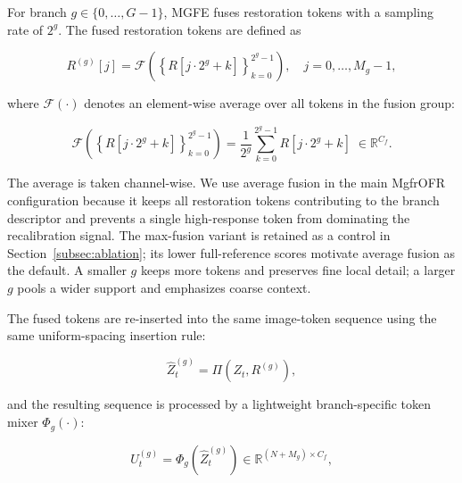 \documentclass[symmetry,article,submit,pdftex,moreauthors]{Definitions/mdpi}
\begin{document}
For branch $g \in \{0,\ldots,G-1\}$, MGFE fuses restoration tokens with a sampling rate of $2^g$. The fused restoration tokens are defined as

\begin{equation}
R^{(g)}[j] =
\mathcal{F}\!\left(
\left\{R[j{\cdot}2^g+k]\right\}_{k=0}^{2^g-1}
\right),\quad
j = 0,\ldots,M_g-1,
\end{equation}

where $\mathcal{F}(\cdot)$ denotes an element-wise average over all tokens in the fusion group:

\begin{equation}
\mathcal{F}\!\left(
\left\{R[j\cdot2^g+k]\right\}_{k=0}^{2^g-1}
\right)
= \frac{1}{2^g}\sum_{k=0}^{2^g-1} R[j\cdot2^g+k]\;\in\mathbb{R}^{C_f}.
\label{eq:avg_fusion}
\end{equation}

The average is taken channel-wise. We use average fusion in the main MgfrOFR configuration because it keeps all restoration tokens contributing to the branch descriptor and prevents a single high-response token from dominating the recalibration signal. The max-fusion variant is retained as a control in Section~\ref{subsec:ablation}; its lower full-reference scores motivate average fusion as the default. A smaller $g$ keeps more tokens and preserves fine local detail; a larger $g$ pools a wider support and emphasizes coarse context.

The fused tokens are re-inserted into the same image-token sequence using the same uniform-spacing insertion rule:

\begin{equation}
\widehat{Z}_t^{(g)} = \Pi\!\left(Z_t,R^{(g)}\right),
\end{equation}

and the resulting sequence is processed by a lightweight branch-specific token mixer $\Phi_g(\cdot)$:

\begin{equation}
U_t^{(g)} = \Phi_g\!\left(\widehat{Z}_t^{(g)}\right)
\in \mathbb{R}^{(N+M_g)\times C_f},
\end{equation}
\end{document}
